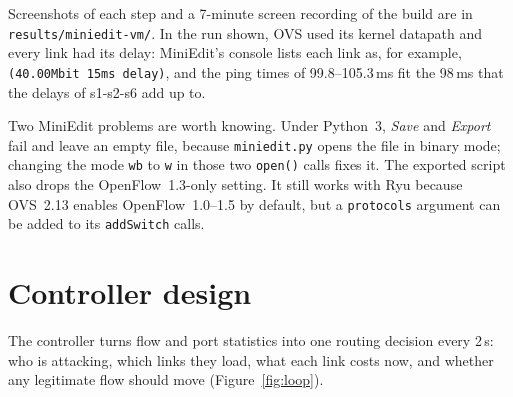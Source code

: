 \documentclass[11pt,a4paper]{article}
\newcommand{\code}[1]{\texttt{#1}}
\newcommand{\figref}[1]{Figure~\ref{#1}}
\begin{document}
Screenshots of each step and a 7-minute screen recording of the build are in \code{results/miniedit-vm/}.
In the run shown, OVS used its kernel datapath and every link had
its delay: MiniEdit's console lists each link as, for example, \code{(40.00Mbit 15ms delay)}, and the ping times
of 99.8--105.3\,ms fit the 98\,ms that the delays of s1-s2-s6 add up to.

Two MiniEdit problems are worth knowing. Under Python~3, \emph{Save} and \emph{Export} fail and leave an empty
file, because \code{miniedit.py} opens the file in binary mode; changing the mode \code{wb} to \code{w} in those
two \code{open()} calls fixes it. The exported script also drops the OpenFlow~1.3-only setting. It still works
with Ryu because OVS~2.13 enables OpenFlow~1.0--1.5 by default, but a \code{protocols} argument can be added to
its \code{addSwitch} calls.

\section{Controller design}

The controller turns flow and port statistics into one routing decision every 2\,s: who is attacking, which links
they load, what each link costs now, and whether any legitimate flow should move (\figref{fig:loop}).
\end{document}
